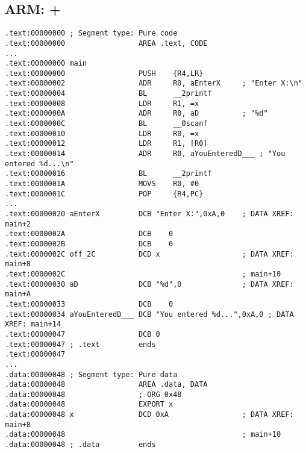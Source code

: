 \subsection{ARM: \OptimizingKeilVI + \ThumbMode}

\begin{lstlisting}
.text:00000000 ; Segment type: Pure code
.text:00000000                 AREA .text, CODE
...
.text:00000000 main
.text:00000000                 PUSH    {R4,LR}
.text:00000002                 ADR     R0, aEnterX     ; "Enter X:\n"
.text:00000004                 BL      __2printf
.text:00000008                 LDR     R1, =x
.text:0000000A                 ADR     R0, aD          ; "%d"
.text:0000000C                 BL      __0scanf
.text:00000010                 LDR     R0, =x
.text:00000012                 LDR     R1, [R0]
.text:00000014                 ADR     R0, aYouEnteredD___ ; "You entered %d...\n"
.text:00000016                 BL      __2printf
.text:0000001A                 MOVS    R0, #0
.text:0000001C                 POP     {R4,PC}
...
.text:00000020 aEnterX         DCB "Enter X:",0xA,0    ; DATA XREF: main+2
.text:0000002A                 DCB    0
.text:0000002B                 DCB    0
.text:0000002C off_2C          DCD x                   ; DATA XREF: main+8
.text:0000002C                                         ; main+10
.text:00000030 aD              DCB "%d",0              ; DATA XREF: main+A
.text:00000033                 DCB    0
.text:00000034 aYouEnteredD___ DCB "You entered %d...",0xA,0 ; DATA XREF: main+14
.text:00000047                 DCB 0
.text:00000047 ; .text         ends
.text:00000047
...
.data:00000048 ; Segment type: Pure data
.data:00000048                 AREA .data, DATA
.data:00000048                 ; ORG 0x48
.data:00000048                 EXPORT x
.data:00000048 x               DCD 0xA                 ; DATA XREF: main+8
.data:00000048                                         ; main+10
.data:00000048 ; .data         ends
\end{lstlisting}


